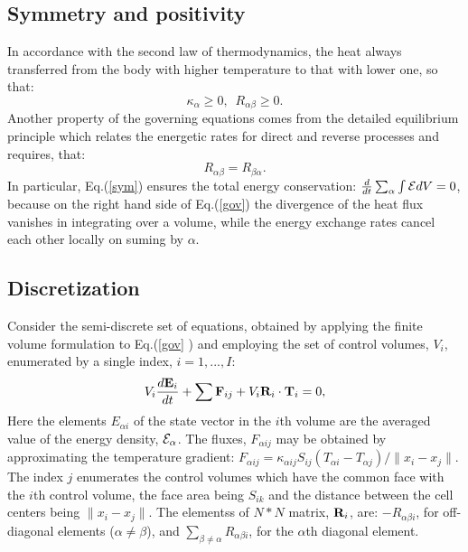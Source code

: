 \subsection{Symmetry and positivity}
In accordance with the second law of thermodynamics, the heat always transferred from 
the body with higher temperature to that with lower one, so that:
\begin{equation}\label{pos}
\kappa_\alpha\ge0,\,\,\,R_{\alpha\beta}\ge0.
\end{equation}
Another property of the governing equations comes from the detailed equilibrium 
principle which relates the energetic rates for direct and reverse processes
and requires, that:
\begin{equation}\label{sym}
R_{\alpha\beta}=R_{\beta\alpha}.
\end{equation}
In particular, Eq.(\ref{sym}) ensures the total energy conservation:
$\frac{d}{dt}\sum_\alpha{\int{{\cal E}dV}}=0$, 
because on the right hand side of Eq.(\ref{gov}) the divergence of the heat flux vanishes in integrating
over a volume, while the energy exchange rates cancel each other locally on suming by $\alpha$.
\subsection{Discretization}
Consider the semi-discrete set of equations, obtained by 
applying the finite volume formulation to Eq.(\ref{gov} ) and employing the set of 
control volumes, $V_i$, enumerated by a single index, $i=1,...,I$:  
\begin{equation}\label{sem}
V_i\frac{d {\bf E}_i}{d t} + \sum{{\bf F}_{ij}}+V_i{\bf R}_i\cdot {\bf T}_i=0,
\end{equation}
Here the elements $E_{\alpha i}$ of the state vector in the $i$th volume are the 
averaged value of the energy density, ${\cal E}_\alpha$. The %
fluxes, 
$F_{\alpha ij}$ may be obtained by approximating the temperature gradient: 
$F_{\alpha ij}= \kappa_{\alpha ij}S_{ij}(T_{\alpha i}- T_{\alpha j})/\|x_i-x_j\|$. The 
index $j$ enumerates the control volumes which have the common face with the $i$th 
control volume, the face area being $S_{ik}$ and the distance 
between the cell centers being $\|x_i-x_j\|$.
%
The elementss of $N*N$ matrix, ${\bf R}_i$, are: 
$-R_{\alpha\beta i}$, for off-diagonal elements ($\alpha\ne\beta$), and 
$\sum_{\beta\ne\alpha}R_{\alpha\beta i}$,
for the $\alpha$th diagonal element.

